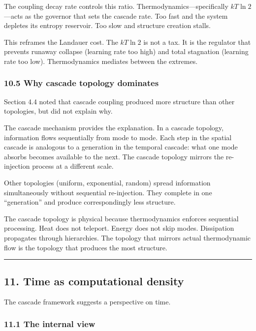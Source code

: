 \documentclass[
  11pt,
  a4paper]{article}
\begin{document}
The coupling decay rate controls this ratio.
Thermodynamics---specifically \(kT \ln 2\)---acts as the governor that
sets the cascade rate. Too fast and the system depletes its entropy
reservoir. Too slow and structure creation stalls.

This reframes the Landauer cost. The \(kT \ln 2\) is not a tax. It is
the regulator that prevents runaway collapse (learning rate too high)
and total stagnation (learning rate too low). Thermodynamics mediates
between the extremes.

\subsubsection{10.5 Why cascade topology
dominates}\label{why-cascade-topology-dominates}

Section 4.4 noted that cascade coupling produced more structure than
other topologies, but did not explain why.

The cascade mechanism provides the explanation. In a cascade topology,
information flows sequentially from mode to mode. Each step in the
spatial cascade is analogous to a generation in the temporal cascade:
what one mode absorbs becomes available to the next. The cascade
topology mirrors the re-injection process at a different scale.

Other topologies (uniform, exponential, random) spread information
simultaneously without sequential re-injection. They complete in one
``generation'' and produce correspondingly less structure.

The cascade topology is physical because thermodynamics enforces
sequential processing. Heat does not teleport. Energy does not skip
modes. Dissipation propagates through hierarchies. The topology that
mirrors actual thermodynamic flow is the topology that produces the most
structure.

\begin{center}\rule{0.5\linewidth}{0.5pt}\end{center}

\subsection{11. Time as computational
density}\label{time-as-computational-density}

The cascade framework suggests a perspective on time.

\subsubsection{11.1 The internal view}\label{the-internal-view}
\end{document}
